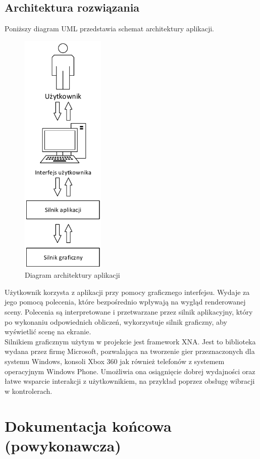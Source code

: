 \documentclass[10pt,a4paper]{article}
\begin{document}
\newpage
\subsection{Architektura rozwiązania}
Poniższy diagram UML przedstawia schemat architektury aplikacji.
\begin{figure}[H]
	\centering
	\includegraphics[width=4cm]{Resources/PDF/system-architecture.pdf}
	\caption{Diagram architektury aplikacji}
\end{figure}

\noindent
Użytkownik korzysta z aplikacji przy pomocy graficznego interfejsu. Wydaje za jego pomocą polecenia, które bezpośrednio wpływają na wygląd renderowanej sceny. Polecenia są interpretowane i przetwarzane przez silnik aplikacyjny, który po wykonaniu odpowiednich obliczeń, wykorzystuje silnik graficzny, aby wyświetlić scenę na ekranie.\\[\baselineskip]
Silnikiem graficznym użytym w projekcie jest framework XNA. Jest to biblioteka wydana przez firmę Microsoft, pozwalająca na tworzenie gier przeznaczonych dla systemu Windows, konsoli Xbox 360 jak również telefonów z systemem operacyjnym Windows Phone. Umożliwia ona osiągnięcie dobrej wydajności oraz łatwe wsparcie interakcji z użytkownikiem, na przykład poprzez obsługę wibracji w kontrolerach.

\newpage
\section{Dokumentacja końcowa (powykonawcza)}
\end{document}
